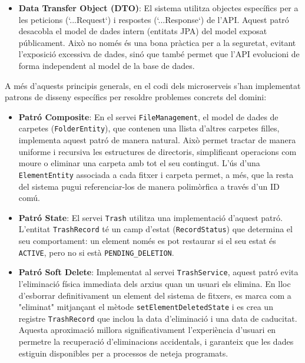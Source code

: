 \begin{itemize}
    \item \textbf{Data Transfer Object (DTO)}: El sistema utilitza objectes específics per a les peticions (`...Request`) i respostes (`...Response`) de l'API. Aquest patró desacobla el model de dades intern (entitats JPA) del model exposat públicament. Això no només és una bona pràctica per a la seguretat, evitant l'exposició excessiva de dades, sinó que també permet que l'API evolucioni de forma independent al model de la base de dades.
\end{itemize}

A més d'aquests principis generals, en el codi dels microserveis s'han implementat patrons de disseny específics per resoldre problemes concrets del domini:
\begin{itemize}
    \item \textbf{Patró Composite}: En el servei \texttt{FileManagement}, el model de dades de carpetes (\texttt{FolderEntity}), que contenen una llista d'altres carpetes filles, implementa aquest patró de manera natural. Això permet tractar de manera uniforme i recursiva les estructures de directoris, simplificant operacions com moure o eliminar una carpeta amb tot el seu contingut. L'ús d'una \texttt{ElementEntity} associada a cada fitxer i carpeta permet, a més, que la resta del sistema pugui referenciar-los de manera polimòrfica a través d'un ID comú.

    \item \textbf{Patró State}: El servei \texttt{Trash} utilitza una implementació d'aquest patró. L'entitat \texttt{TrashRecord} té un camp d'estat (\texttt{RecordStatus}) que determina el seu comportament: un element només es pot restaurar si el seu estat és \texttt{ACTIVE}, pero no si està \texttt{PENDING\_DELETION}.

    \item \textbf{Patró Soft Delete}: Implementat al servei \texttt{TrashService}, aquest patró evita l'eliminació física immediata dels arxius quan un usuari els elimina. En lloc d'esborrar definitivament un element del sistema de fitxers, es marca com a "eliminat" mitjançant el mètode \texttt{setElementDeletedState} i es crea un registre \texttt{TrashRecord} que inclou la data d'eliminació i una data de caducitat. Aquesta aproximació millora significativament l'experiència d'usuari en permetre la recuperació d'eliminacions accidentals, i garanteix que les dades estiguin disponibles per a processos de neteja programats.


\end{itemize}
